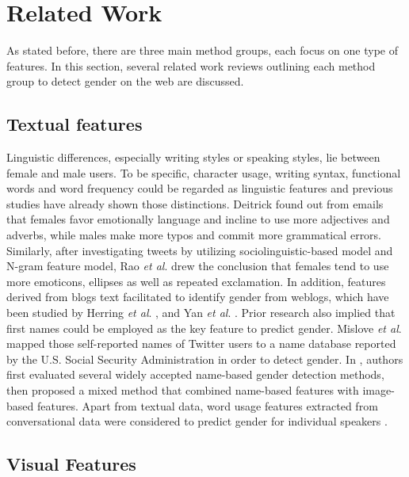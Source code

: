 \documentclass[runningheads]{llncs}
\begin{document}
	
	\section{Related Work}
	
	As stated before, there are three main method groups, each focus on one type of features. In this section, several related work reviews outlining each method group to detect gender on the web are discussed. 
	
	\subsection{Textual features}
	
	Linguistic differences, especially writing styles or speaking styles, lie between female and male users. To be specific, character usage, writing syntax, functional words and word frequency could be regarded as linguistic features \cite{deitrick2012author} and previous studies have already shown those distinctions. Deitrick \cite{deitrick2012author} found out from emails that females favor emotionally language and incline to use more adjectives and adverbs, while males make more typos and commit more grammatical errors. Similarly, after investigating tweets by utilizing sociolinguistic-based model and N-gram feature model, Rao \textit{et al}. \cite{rao2010classifying} drew the conclusion that females tend to use more emoticons, ellipses as well as repeated exclamation. In addition, features derived from blogs text facilitated to identify gender from weblogs, which have been studied by Herring \textit{et al}. \cite{herring2004bridging}, and Yan \textit{et al}. \cite{yan2006gender}. Prior research also implied that first names could be employed as the key feature to predict gender. Mislove \textit{et al}. \cite{mislove2011understanding} mapped those self-reported names of Twitter users to a name database reported by the U.S. Social Security Administration in order to detect gender.  In \cite{karimi2016inferring}, authors first evaluated several widely accepted name-based gender detection methods, then proposed a mixed method that combined name-based features with image-based features. Apart from textual data, word usage features extracted from conversational data were considered to predict gender for individual speakers \cite{gillick2010can}.  
	
	\subsection{Visual Features}
	
\end{document}
